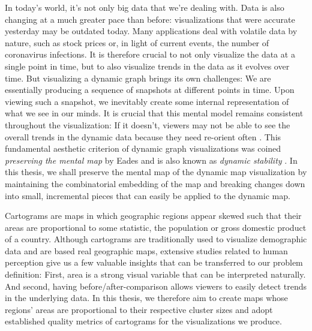 In today's world, it's not only big data that we're dealing with. Data is also changing at a much greater pace than before: visualizations that were accurate yesterday may be outdated today. Many applications deal with volatile data by nature, such as stock prices or, in light of current events, the number of coronavirus infections. It is therefore crucial to not only visualize the data at a single point in time, but to also visualize trends in the data as it evolves over time. But visualizing a dynamic graph brings its own challenges: We are essentially producing a sequence of snapshots at different points in time. Upon viewing such a snapshot, we inevitably create some internal representation of what we see in our minds. It is crucial that this mental model remains consistent throughout the visualization: If it doesn't, viewers may not be able to see the overall trends in the dynamic data because they need re-orient often \cite{bohringer1990using} \cite{lee2006mental} \cite{purchase2006important}. This fundamental aesthetic criterion of dynamic graph visualizations was coined \emph{preserving the mental map} by Eades \etal{} \cite{eades1991preserving} \cite{misue1995layout} and is also known as \emph{dynamic stability} \cite{diehl2002graphs}.
In this thesis, we shall preserve the mental map of the dynamic map visualization by maintaining the combinatorial embedding of the map and breaking changes down into small, incremental pieces that can easily be applied to the dynamic map.

Cartograms are maps in which geographic regions appear skewed such that their areas are proportional to some statistic, \eg{} the population or gross domestic product of a country. Although cartograms are traditionally used to visualize demographic data and are based real geographic maps, extensive studies related to human perception \cite{nusrat2016state} \cite{nusrat2018evaluating} give us a few valuable insights that can be transferred to our problem definition: First, area is a strong visual variable that can be interpreted naturally. And second, having before/after-comparison allows viewers to easily detect trends in the underlying data.
In this thesis, we therefore aim to create maps whose regions' areas are proportional to their respective cluster sizes and adopt established quality metrics of cartograms for the visualizations we produce.


